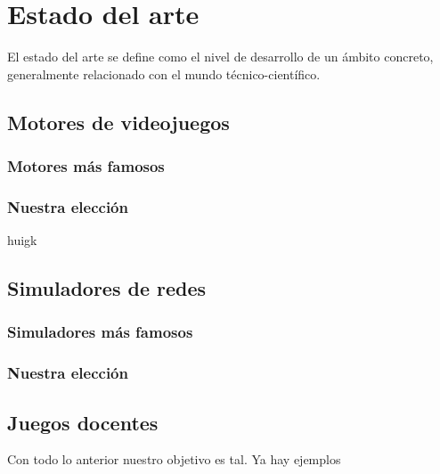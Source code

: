 \chapter{Estado del arte}\label{chap:ArtState}

El estado del arte se define como el nivel de desarrollo de un ámbito concreto, generalmente relacionado con el mundo técnico-científico.

\section{Motores de videojuegos}

\subsection{Motores más famosos}

\subsection{Nuestra elección}

huigk

\section{Simuladores de redes}

\subsection{Simuladores más famosos}

\subsection{Nuestra elección}



\section{Juegos docentes}

Con todo lo anterior nuestro objetivo es tal. Ya hay ejemplos